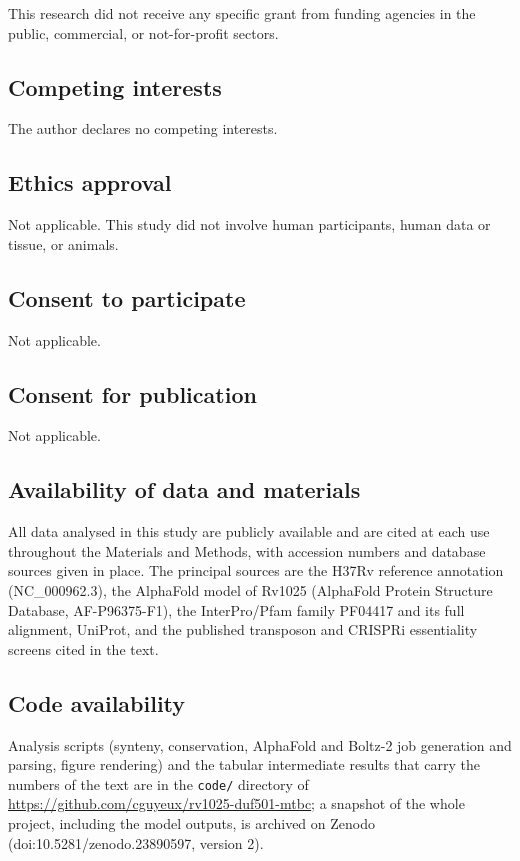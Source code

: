 \documentclass[11pt,a4paper]{article}
\begin{document}
This research did not receive any specific grant from funding agencies in the public, commercial, or not-for-profit sectors.

\subsection*{Competing interests}

The author declares no competing interests.

\subsection*{Ethics approval}

Not applicable. This study did not involve human participants, human data or tissue, or animals.

\subsection*{Consent to participate}

Not applicable.

\subsection*{Consent for publication}

Not applicable.

\subsection*{Availability of data and materials}

All data analysed in this study are publicly available and are cited at each use throughout the Materials and Methods, with accession numbers and database sources given in place. The principal sources are the H37Rv reference annotation (NC\_000962.3), the AlphaFold model of Rv1025 (AlphaFold Protein Structure Database, AF-P96375-F1), the InterPro/Pfam family PF04417 and its full alignment, UniProt, and the published transposon and CRISPRi essentiality screens cited in the text.

\subsection*{Code availability}

Analysis scripts (synteny, conservation, AlphaFold and Boltz-2 job generation and parsing, figure rendering) and the tabular intermediate results that carry the numbers of the text are in the \texttt{code/} directory of \url{https://github.com/cguyeux/rv1025-duf501-mtbc}; a snapshot of the whole project, including the model outputs, is archived on Zenodo (doi:10.5281/zenodo.23890597, version 2).
\end{document}
